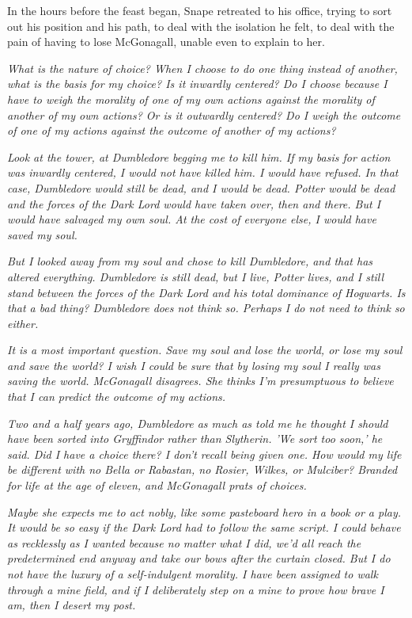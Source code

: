 \documentclass[a4paper,11pt]{article}
\begin{document}
In the hours before the feast began, Snape retreated to his office, trying to sort out his position and his path, to deal with the isolation he felt, to deal with the pain of having to lose McGonagall, unable even to explain to her.

\emph{What is the nature of choice? When I choose to do one thing instead of another, what is the basis for my choice? Is it inwardly centered? Do I choose because I have to weigh the morality of one of my own actions against the morality of another of my own actions? Or is it outwardly centered? Do I weigh the outcome of one of my actions against the outcome of another of my actions?}

\emph{Look at the tower, at Dumbledore begging me to kill him. If my basis for action was inwardly centered, I would not have killed him. I would have refused. In that case, Dumbledore would still be dead, and I would be dead. Potter would be dead and the forces of the Dark Lord would have taken over, then and there. But I would have salvaged my own soul. At the cost of everyone else, I would have saved my soul.}

\emph{But I looked away from my soul and chose to kill Dumbledore, and that has altered everything. Dumbledore is still dead, but I live, Potter lives, and I still stand between the forces of the Dark Lord and his total dominance of Hogwarts. Is that a bad thing? Dumbledore does not think so. Perhaps I do not need to think so either.}

\emph{It is a most important question. Save my soul and lose the world, or lose my soul and save the world? I wish I could be sure that by losing my soul I really was saving the world. McGonagall disagrees. She thinks I'm presumptuous to believe that I can predict the outcome of my actions.}

\emph{Two and a half years ago, Dumbledore as much as told me he thought I should have been sorted into Gryffindor rather than Slytherin. 'We sort too soon,' he said. Did I have a choice there? I don't recall being given one. How would my life be different with no Bella or Rabastan, no Rosier, Wilkes, or Mulciber? Branded for life at the age of eleven, and McGonagall prats of choices.}

\emph{Maybe she expects me to act nobly, like some pasteboard hero in a book or a play. It would be so easy if the Dark Lord had to follow the same script. I could behave as recklessly as I wanted because no matter what I did, we'd all reach the predetermined end anyway and take our bows after the curtain closed. But I do not have the luxury of a self-indulgent morality. I have been assigned to walk through a mine field, and if I deliberately step on a mine to prove how brave I am, then I desert my post.}
\end{document}
